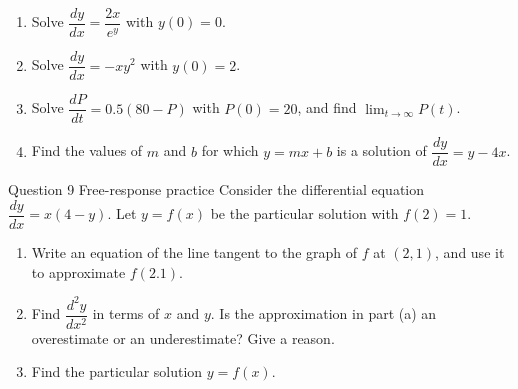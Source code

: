 \documentclass[11pt]{article}
\begin{document}
\begin{enumerate}[leftmargin=*,itemsep=2pt,start=5]
  \item Solve $\dfrac{dy}{dx}=\dfrac{2x}{e^{y}}$ with $y(0)=0$.\work{2.8cm}
  \item Solve $\dfrac{dy}{dx}=-xy^2$ with $y(0)=2$.\work{2.8cm}
  \item Solve $\dfrac{dP}{dt}=0.5(80-P)$ with $P(0)=20$, and find $\displaystyle\lim_{t\to\infty}P(t)$.\work{2.8cm}
  \item Find the values of $m$ and $b$ for which $y=mx+b$ is a solution of $\dfrac{dy}{dx}=y-4x$.\work{2.8cm}
\end{enumerate}

\begin{frbox}{Question 9 \textperiodcentered{} Free-response practice}
Consider the differential equation $\dfrac{dy}{dx}=x(4-y)$. Let $y=f(x)$ be the particular solution with $f(2)=1$.
\begin{enumerate}[label=(\alph*),leftmargin=*,itemsep=2pt]
  \item Write an equation of the line tangent to the graph of $f$ at $(2,1)$, and use it to approximate $f(2.1)$.\work{2.6cm}
  \item Find $\dfrac{d^2y}{dx^2}$ in terms of $x$ and $y$. Is the approximation in part (a) an overestimate or an underestimate? Give a reason.\work{2.6cm}
  \item Find the particular solution $y=f(x)$.\work{2.6cm}
\end{enumerate}
\end{frbox}
\end{document}
